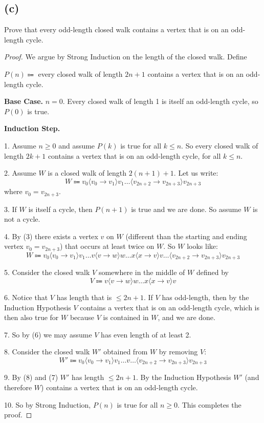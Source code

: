 \documentclass[14pt]{extarticle}
\begin{document}
\subsection{(c)}
Prove that every odd-length closed walk contains a vertex that is on an odd-length cycle.
\begin{proof}
We argue by Strong Induction on the length of the closed walk. Define
\begin{center}
$P(n) \Coloneqq$ every closed walk of length $2n+1$ contains a vertex that is on an odd-length cycle.
\end{center}

{\bf Base Case.} $n = 0$. Every closed walk of length 1 is itself an odd-length cycle, so $P(0)$ is true.

{\bf Induction Step.} 

1. Assume $n \geq 0$ and assume $P(k)$ is true for all $k \leq n$. So every closed walk of length $2k+1$ contains a vertex that is on an odd-length cycle, for all $k \leq n$.

2. Assume $W$ is a closed walk of length $2(n+1) + 1$. Let us write:
$$
W \Coloneqq v_0 \langle v_0 \to v_1\rangle v_1 \ldots \langle v_{2n+2} \to v_{2n+3}\rangle v_{2n+3}
$$
where $v_0 = v_{2n+3}$.

3. If $W$ is itself a cycle, then $P(n+1)$ is true and we are done. So assume $W$ is not a cycle.

4. By (3) there exists a vertex $v$ on $W$ (different than the starting and ending vertex $v_0 = v_{2n+3}$) that occurs at least twice on $W$. So $W$ looks like:
$$
W \Coloneqq v_0 \langle v_0 \to v_1\rangle v_1 \ldots v \langle v \to w\rangle w \ldots x \langle x \to v\rangle v \ldots  \langle v_{2n+2} \to v_{2n+3}\rangle v_{2n+3}
$$

5. Consider the closed walk $V$ somewhere in the middle of $W$ defined by
$$
V \Coloneqq v \langle v \to w\rangle w \ldots x \langle x \to v\rangle v
$$

6. Notice that $V$ has length that is $\leq 2n+1$. If $V$ has odd-length, then by the Induction Hypothesis $V$ contains a vertex that is on an odd-length cycle, which is then also true for $W$ because $V$ is contained in $W$, and we are done.

7. So by (6) we may assume $V$ has even length of at least 2.

8. Consider the closed walk $W'$ obtained from $W$ by removing $V$:
$$
W' \Coloneqq v_0 \langle v_0 \to v_1\rangle v_1 \ldots v  \ldots  \langle v_{2n+2} \to v_{2n+3}\rangle v_{2n+3}
$$

9. By (8) and (7) $W'$ has length $\leq 2n+1$. By the Induction Hypothesis $W'$ (and therefore $W$) contains a vertex that is on an odd-length cycle.

10. So by Strong Induction, $P(n)$ is true for all $n \geq 0$. This completes the proof.
\end{proof}
\end{document}
